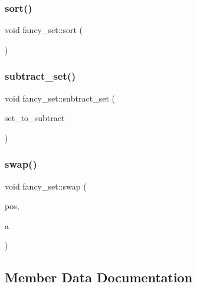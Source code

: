 \mbox{\label{classfancy__set_aa757da529107b6f0397cafada1423712}} 
\subsubsection{\texorpdfstring{sort()}{sort()}}
{\footnotesize\ttfamily void fancy\+\_\+set\+::sort (\begin{DoxyParamCaption}{ }\end{DoxyParamCaption})}

\mbox{\label{classfancy__set_a111234826ca45c820fc28c8424cb8093}} 
\subsubsection{\texorpdfstring{subtract\+\_\+set()}{subtract\_set()}}
{\footnotesize\ttfamily void fancy\+\_\+set\+::subtract\+\_\+set (\begin{DoxyParamCaption}\item[{\mbox{\hyperlink{classfancy__set}{fancy\+\_\+set}} $\ast$}]{set\+\_\+to\+\_\+subtract }\end{DoxyParamCaption})}

\mbox{\label{classfancy__set_abf9e1b0592f017be71ca410371b04754}} 
\subsubsection{\texorpdfstring{swap()}{swap()}}
{\footnotesize\ttfamily void fancy\+\_\+set\+::swap (\begin{DoxyParamCaption}\item[{\mbox{\hyperlink{galois_8h_a09fddde158a3a20bd2dcadb609de11dc}{I\+NT}}}]{pos,  }\item[{\mbox{\hyperlink{galois_8h_a09fddde158a3a20bd2dcadb609de11dc}{I\+NT}}}]{a }\end{DoxyParamCaption})}



\subsection{Member Data Documentation}
\mbox{\label{classfancy__set_a6770248166448a9c0bad3d85c071e9ad}} 
